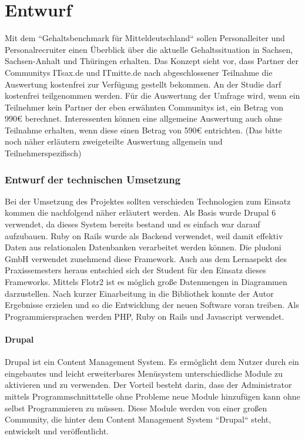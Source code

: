 \part{Entwurf}
\label{sec:entwurf}
Mit dem ``Gehaltsbenchmark für Mitteldeutschland`` sollen Personalleiter und Personalrecruiter einen Überblick über die aktuelle Gehaltssituation in Sachsen, Sachsen-Anhalt und Thüringen erhalten. 
Das Konzept sieht vor, dass Partner der Communitys ITsax.de und ITmitte.de nach abgeschlossener Teilnahme die Auswertung kostenfrei zur Verfügung gestellt bekommen. An der Studie darf kostenfrei teilgenommen werden. Für die Auswertung der Umfrage wird, wenn ein Teilnehmer kein Partner der eben erwähnten Communitys ist, ein Betrag von 990€ berechnet. 
Interessenten können eine allgemeine Auswertung auch ohne Teilnahme erhalten, wenn diese einen Betrag von 590€ entrichten. (Das bitte noch näher erläutern zweigeteilte Auswertung allgemein und Teilnehmerspezifisch)
\section{Entwurf der technischen Umsetzung}
Bei der Umsetzung des Projektes sollten verschieden Technologien zum Einsatz kommen die nachfolgend näher erläutert werden. Als Basis wurde Drupal 6 verwendet, da dieses System bereits bestand und es einfach war darauf aufzubauen. Ruby on Rails wurde als Backend verwendet, weil damit effektiv Daten aus relationalen Datenbanken verarbeitet werden können. Die pludoni GmbH verwendet zunehmend diese Framework. Auch aus dem Lernaspekt des Praxissemesters heraus entschied sich der Student für den Einsatz dieses Frameworks. Mittels Flotr2 ist es möglich große Datenmengen in Diagrammen darzustellen. Nach kurzer Einarbeitung in die Bibliothek konnte der Autor Ergebnisse erzielen und so die Entwicklung der neuen Software voran treiben. 
Als Programmiersprachen werden PHP, Ruby on Rails \cite{rails} und Javascript verwendet. 
\subsection{Drupal}
Drupal ist ein Content Management System. Es ermöglicht dem Nutzer durch ein eingebautes und leicht erweiterbares Menüsystem unterschiedliche Module zu aktivieren und zu verwenden. 
Der Vorteil besteht darin, dass der Administrator mittels Programmschnittstelle ohne Probleme neue Module hinzufügen kann ohne selbst Programmieren zu müssen. 
Diese Module werden von einer großen Community, die hinter dem Content Management System ``Drupal`` steht, entwickelt und veröffentlicht. %
